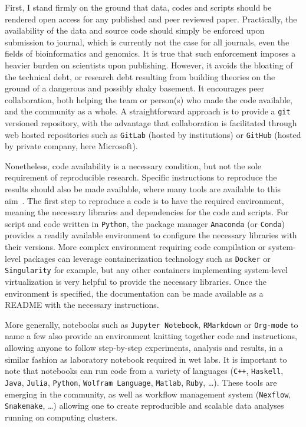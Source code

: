 First, I stand firmly on the ground that data, codes and scripts should be rendered open access for any published and peer reviewed paper.
Practically, the availability of the data and source code should simply be enforced upon submission to journal, which is currently not the case for all journals, even the fields of bioinformatics and genomics.
It is true that such enforcement imposes a heavier burden on scientists upon publishing.
However, it avoids the bloating of the technical debt, or research debt resulting from building theories on the ground of a dangerous and possibly shaky basement.
It encourages peer collaboration, both helping the team or person(s) who made the code available, and the community as a whole.
A straightforward approach is to provide a \texttt{git} versioned repository, with the advantage that collaboration is facilitated through web hosted repositories such as \texttt{GitLab} (hosted by institutions) or \texttt{GitHub} (hosted by private company, here Microsoft).

Nonetheless, code availability is a necessary condition, but not the sole requirement of reproducible research.
Specific instructions to reproduce the results should also be made available, where many tools are available to this aim~\citep{Wilson2014,Darriba2018}.
The first step to reproduce a code is to have the required environment, meaning the necessary libraries and dependencies for the code and scripts.
For script and code written in \texttt{Python}, the package manager \texttt{Anaconda} (or \texttt{Conda}) provides a readily available environment to configure the necessary libraries with their versions.
More complex environment requiring code compilation or system-level packages can leverage containerization technology such as \texttt{Docker} or \texttt{Singularity} for example, but any other containers implementing system-level virtualization is very helpful to provide the necessary libraries.
Once the environment is specified, the documentation can be made available as a README with the necessary instructions.

More generally, notebooks such as \texttt{Jupyter Notebook}, \texttt{RMarkdown} or \texttt{Org-mode} to name a few also provide an environment knitting together code and instructions, allowing anyone to follow step-by-step experiments, analysis and results, in a similar fashion as laboratory notebook required in wet labs.
It is important to note that notebooks can run code from a variety of languages (\texttt{C++}, \texttt{Haskell}, \texttt{Java}, \texttt{Julia}, \texttt{Python}, \texttt{Wolfram Language}, \texttt{Matlab}, \texttt{Ruby}, \ldots).
These tools are emerging in the community, as well as workflow management system (\texttt{Nexflow}, \texttt{Snakemake}, \ldots) allowing one to create reproducible and scalable data analyses running on computing clusters.

